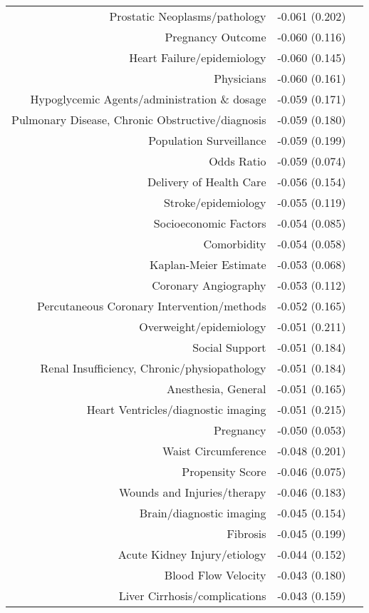 \begin{longtable}[l]{rr@{}l@{ }}
Prostatic Neoplasms/pathology & -0.061 (0.202) & $^{}$\\
Pregnancy Outcome & -0.060 (0.116) & $^{}$\\
Heart Failure/epidemiology & -0.060 (0.145) & $^{}$\\
Physicians & -0.060 (0.161) & $^{}$\\
Hypoglycemic Agents/administration \& dosage & -0.059 (0.171) & $^{}$\\
Pulmonary Disease, Chronic Obstructive/diagnosis & -0.059 (0.180) & $^{}$\\
Population Surveillance & -0.059 (0.199) & $^{}$\\
Odds Ratio & -0.059 (0.074) & $^{}$\\
Delivery of Health Care & -0.056 (0.154) & $^{}$\\
Stroke/epidemiology & -0.055 (0.119) & $^{}$\\
Socioeconomic Factors & -0.054 (0.085) & $^{}$\\
Comorbidity & -0.054 (0.058) & $^{}$\\
Kaplan-Meier Estimate & -0.053 (0.068) & $^{}$\\
Coronary Angiography & -0.053 (0.112) & $^{}$\\
Percutaneous Coronary Intervention/methods & -0.052 (0.165) & $^{}$\\
Overweight/epidemiology & -0.051 (0.211) & $^{}$\\
Social Support & -0.051 (0.184) & $^{}$\\
Renal Insufficiency, Chronic/physiopathology & -0.051 (0.184) & $^{}$\\
Anesthesia, General & -0.051 (0.165) & $^{}$\\
Heart Ventricles/diagnostic imaging & -0.051 (0.215) & $^{}$\\
Pregnancy & -0.050 (0.053) & $^{}$\\
Waist Circumference & -0.048 (0.201) & $^{}$\\
Propensity Score & -0.046 (0.075) & $^{}$\\
Wounds and Injuries/therapy & -0.046 (0.183) & $^{}$\\
Brain/diagnostic imaging & -0.045 (0.154) & $^{}$\\
Fibrosis & -0.045 (0.199) & $^{}$\\
Acute Kidney Injury/etiology & -0.044 (0.152) & $^{}$\\
Blood Flow Velocity & -0.043 (0.180) & $^{}$\\
Liver Cirrhosis/complications & -0.043 (0.159) & $^{}$\\

\end{longtable}
